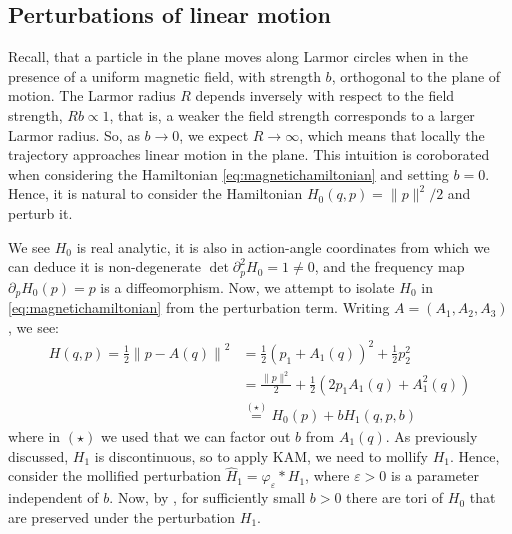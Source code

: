 \subsection{Perturbations of linear motion}

Recall, that a particle in the plane moves along Larmor circles when in the presence of a uniform magnetic field, with strength $b$, orthogonal to the plane of motion. The Larmor radius $R$ depends inversely with respect to the field strength, $Rb\varpropto 1$, that is, a weaker the field strength corresponds to a larger Larmor radius. So, as $b\to 0$, we expect $R\to\infty$, which means that locally the trajectory approaches linear motion in the plane. This intuition is coroborated when considering the Hamiltonian \eqref{eq:magnetichamiltonian} and setting $b=0$. Hence, it is natural to consider the Hamiltonian $H_0(q,p)=\|p\|^2/2$ and perturb it.

We see $H_0$ is real analytic, it is also in action-angle coordinates from which we can deduce it is non-degenerate $\det \partial_p^2 H_0=1\neq0$, and the frequency map $\partial_p H_0(p) = p$ is a diffeomorphism. Now, we attempt to isolate $H_0$ in \eqref{eq:magnetichamiltonian} from the perturbation term. Writing $A = (A_1,A_2,A_3)$, we see:
\begin{align*}
H(q,p) = \frac{1}{2}\left\|p-A(q)\right\|^2
  &= \frac{1}{2}\left(p_1+ A_1(q)\right)^2 + \frac{1}{2}p_2^2\\
  &= \frac{\|p\|^2}{2} + \frac{1}{2}\left(2p_1A_1(q)+A_1^2(q)\right)\\
  &\stackrel{(\star)}{=} H_0(p) + bH_1(q,p,b)
\end{align*}
where in $(\star)$ we used that we can factor out $b$ from $A_1(q)$. As previously discussed, $H_1$ is discontinuous, so to apply KAM, we need to mollify $H_1$. Hence, consider the mollified perturbation $\hat H_1 = \varphi_\varepsilon*H_1$, where $\varepsilon>0$ is a parameter independent of $b$. Now, by , for sufficiently small $b>0$ there are tori of $H_0$ that are preserved under the perturbation $H_1$.

